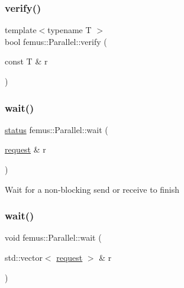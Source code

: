 \mbox{\label{namespacefemus_1_1_parallel_a228cad24a8dc0968b965c0986428ad4a}} 
\subsubsection{\texorpdfstring{verify()}{verify()}}
{\footnotesize\ttfamily template$<$typename T $>$ \\
bool femus\+::\+Parallel\+::verify (\begin{DoxyParamCaption}\item[{const T \&}]{r }\end{DoxyParamCaption})\hspace{0.3cm}{\ttfamily [inline]}}

\mbox{\label{namespacefemus_1_1_parallel_a893385de2800726af28b56b1c5630d2f}} 
\subsubsection{\texorpdfstring{wait()}{wait()}\hspace{0.1cm}{\footnotesize\ttfamily [1/3]}}
{\footnotesize\ttfamily \mbox{\hyperlink{structfemus_1_1_parallel_1_1status}{status}} femus\+::\+Parallel\+::wait (\begin{DoxyParamCaption}\item[{\mbox{\hyperlink{structfemus_1_1_parallel_1_1request}{request}} \&}]{r }\end{DoxyParamCaption})\hspace{0.3cm}{\ttfamily [inline]}}

Wait for a non-\/blocking send or receive to finish \mbox{\label{namespacefemus_1_1_parallel_a135cd955845e4e6ce003a4455ec54b17}} 
\subsubsection{\texorpdfstring{wait()}{wait()}\hspace{0.1cm}{\footnotesize\ttfamily [2/3]}}
{\footnotesize\ttfamily void femus\+::\+Parallel\+::wait (\begin{DoxyParamCaption}\item[{std\+::vector$<$ \mbox{\hyperlink{structfemus_1_1_parallel_1_1request}{request}} $>$ \&}]{r }\end{DoxyParamCaption})\hspace{0.3cm}{\ttfamily [inline]}}


